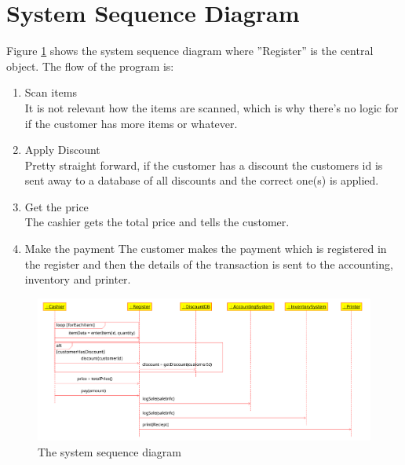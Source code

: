 \documentclass[a4paper]{scrreprt}
\begin{document}
    \newpage
    
    \section{System Sequence Diagram}
        Figure \ref{fig:ssd} shows the system sequence diagram where ''Register'' is 
        the central object. The flow of the program is:
        
        \begin{enumerate}
            \item Scan items \\
                It is not relevant how the items are scanned, which is why there's no
                logic for if the customer has more items or whatever.
                
            \item Apply Discount \\
                Pretty straight forward, if the customer has a discount the customers
                id is sent away to a database of all discounts and the correct one(s) is
                applied. 
                
            \item Get the price \\
                The cashier gets the total price and tells the customer.
                
            \item Make the payment
                The customer makes the payment which is registered in the register and
                then the details of the transaction is sent to the accounting, inventory
                and printer.
                
        \end{enumerate}
        
        \begin{figure}[ht!]
            \begin{center}
                \includegraphics[scale=0.3]{ssd1.png}
                \caption{The system sequence diagram}
                \label{fig:ssd}
            \end{center}
        \end{figure}
\end{document}
